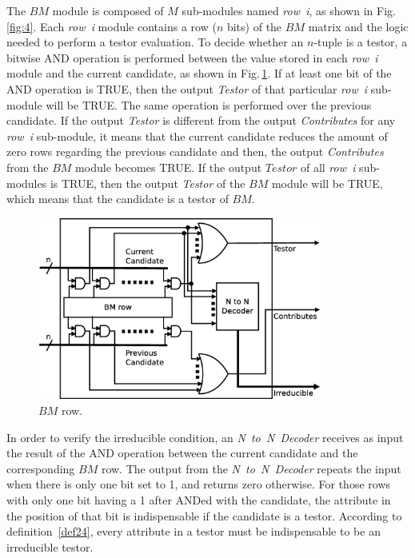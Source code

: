 \documentclass[authoryear,preprint,review,12pt]{elsarticle}
\begin{document}
The $BM$ module is composed of $M$ sub-modules named \textit{row~i}, as shown
in Fig.\,\ref{fig:4}. Each \textit{row~i} module contains a row ($n$ bits)
of the $BM$ matrix and the logic needed to perform a testor evaluation. To decide
whether an $n$-tuple is a testor, a bitwise AND operation is performed
between the value stored in each \textit{row~i} module and the current
candidate, as shown in Fig.\,\ref{fig:row}. If at least one bit of the AND operation is TRUE,
then the output \textit{Testor} of that particular \textit{row~i} sub-module
will be TRUE. The same operation is performed over the previous candidate.
If the output \textit{Testor} is different from
the output \textit{Contributes} for any \textit{row~i} sub-module,
it means that the current candidate reduces the amount of zero rows regarding the previous candidate and
then, the output \textit{Contributes} from the $BM$ module becomes TRUE.
If the output $Testor$ of all  \textit{row~i} sub-modules is
TRUE, then the output \textit{Testor} of the $BM$ module will be TRUE,
which means that the candidate is a testor of $BM$.


\begin{figure}[htb]
    \begin{center}
        \includegraphics[height=6cm]{BM_row.eps}
    \end{center}
\caption{$BM$ row.}
\label{fig:row}
\end{figure}

In order to verify the irreducible condition, an \textit{N~to~N~Decoder}
receives as input the result of the AND operation between the current candidate and the corresponding $BM$ row.
The output from the \textit{N~to~N~Decoder} repeats the input when there is only one bit set
to 1, and returns zero otherwise. For those rows with only one bit having a 1 after ANDed with the candidate,
the attribute in the position of that bit is indispensable if the candidate is a testor.
According to definition~\ref{def24}, every attribute in a testor must be indispensable to be an
irreducible testor. %
\end{document}

